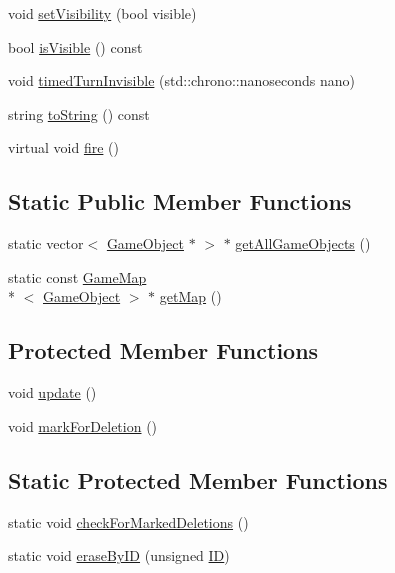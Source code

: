 \begin{DoxyCompactItemize}
\item 
void \hyperlink{class_game_object_a172a0c544564afa8125957ad85772627}{set\-Visibility} (bool visible)
\item 
bool \hyperlink{class_game_object_a63a8b301423180c9ff003e0a1145104f}{is\-Visible} () const 
\item 
void \hyperlink{class_game_object_abfdb9aa04ec756de76c906001f060e16}{timed\-Turn\-Invisible} (std\-::chrono\-::nanoseconds nano)
\item 
string \hyperlink{class_game_object_a6f501dd4b129026d1156745de0046c63}{to\-String} () const 
\item 
virtual void \hyperlink{class_game_object_aefab5eddd7dfc186c7e5ba34bbefce41}{fire} ()
\end{DoxyCompactItemize}
\subsection*{Static Public Member Functions}
\begin{DoxyCompactItemize}
\item 
static vector$<$ \hyperlink{class_game_object}{Game\-Object} $\ast$ $>$ $\ast$ \hyperlink{class_game_object_a720f74ac34297ad4cee79723ecd2379e}{get\-All\-Game\-Objects} ()
\item 
static const \hyperlink{class_game_map}{Game\-Map}\\*
$<$ \hyperlink{class_game_object}{Game\-Object} $>$ $\ast$ \hyperlink{class_game_object_ab67caafcd6df99f7b9d022f1595c0f9a}{get\-Map} ()
\end{DoxyCompactItemize}
\subsection*{Protected Member Functions}
\begin{DoxyCompactItemize}
\item 
void \hyperlink{class_game_object_adad7d284b670db722a2fda8e6a7997e3}{update} ()
\item 
void \hyperlink{class_game_object_ad99b7e0e0138da7cc825a13a1a0c5326}{mark\-For\-Deletion} ()
\end{DoxyCompactItemize}
\subsection*{Static Protected Member Functions}
\begin{DoxyCompactItemize}
\item 
static void \hyperlink{class_game_object_a1996f540da697fa10aa874aa0e6e4572}{check\-For\-Marked\-Deletions} ()
\item 
static void \hyperlink{class_game_object_a4c75b1045f9e490c8aee0c4bcf9177d3}{erase\-By\-I\-D} (unsigned \hyperlink{class_game_object_a4db8b68d725cbea63ea94ced03add071}{I\-D})
\end{DoxyCompactItemize}
